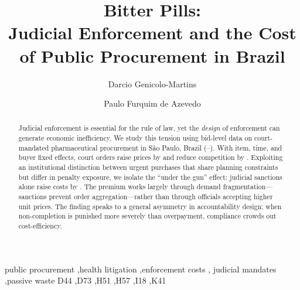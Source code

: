 \documentclass[review,12pt,authoryear]{elsarticle}
\begin{document}
\begin{frontmatter}

\title{Bitter Pills:\\ Judicial Enforcement and the Cost of Public Procurement in Brazil%
}

\author[INSPER]{Darcio Genicolo-Martins}
\author[INSPER]{Paulo Furquim de Azevedo}
\address[INSPER]{Insper Institute of Education and Research,
  Rua Quat\'a 300, S\~ao Paulo, SP 04546-042, Brazil}

\begin{abstract}
Judicial enforcement is essential for the rule of law, yet the
\emph{design} of enforcement can generate economic inefficiency.
We study this tension using bid-level data on court-mandated
pharmaceutical procurement in S\~ao Paulo, Brazil
(\BPsampleStartYear--\BPsampleEndYear).
With item, time, and buyer fixed effects, court orders raise
prices by \BPnegPctHeadline{} and reduce competition by
\BPfirmsPctHeadline{}. Exploiting an institutional distinction
between urgent purchases that share planning constraints but
differ in penalty exposure, we isolate the ``under the gun''
effect: judicial sanctions alone raise costs by \BPutgPctRange.
The premium works largely through demand fragmentation---sanctions
prevent order aggregation---rather than through officials
accepting higher unit prices. The finding speaks to a general
asymmetry in accountability design: when non-completion is
punished more severely than overpayment, compliance crowds out
cost-efficiency.
\end{abstract}

\begin{keyword}
public procurement \sep health litigation \sep enforcement costs \sep
judicial mandates \sep passive waste
\JEL D44 \sep D73 \sep H51 \sep H57 \sep I18 \sep K41
\end{keyword}

\end{frontmatter}











\end{document}
